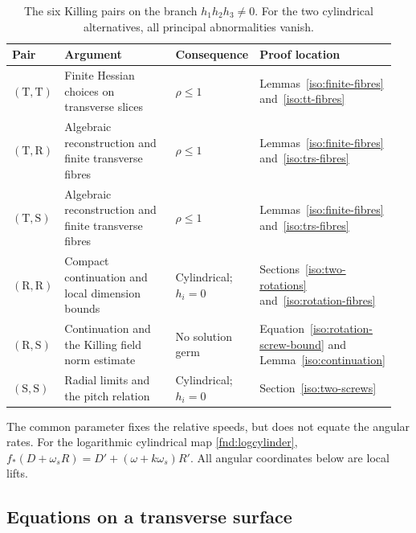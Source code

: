 \documentclass[11pt,a4paper]{article}
\numberwithin{equation}{section}
\theoremstyle{plain}
\theoremstyle{definition}
\theoremstyle{remark}
\begin{document}
\begin{table}[htbp]
\centering
\small
\renewcommand{\arraystretch}{1.12}
\setlength{\tabcolsep}{3pt}
\caption{The six Killing pairs on the branch $h_1h_2h_3\ne0$.
For the two cylindrical alternatives, all principal abnormalities vanish.}
\label{tab:killing-pairs}
\begin{tabular}{@{}>{\raggedright\arraybackslash}p{0.13\linewidth}>{\raggedright\arraybackslash}p{0.37\linewidth}>{\raggedright\arraybackslash}p{0.18\linewidth}>{\raggedright\arraybackslash}p{0.27\linewidth}@{}}
\toprule
Pair & Argument & Consequence & Proof location\\
\midrule
$(\mathrm T,\mathrm T)$ &
Finite Hessian choices on transverse slices &
$\rho\le1$ &
Lemmas~\ref{iso:finite-fibres} and~\ref{iso:tt-fibres}\\
\addlinespace
$(\mathrm T,\mathrm R)$ &
Algebraic reconstruction and finite transverse fibres &
$\rho\le1$ &
Lemmas~\ref{iso:finite-fibres} and~\ref{iso:trs-fibres}\\
\addlinespace
$(\mathrm T,\mathrm S)$ &
Algebraic reconstruction and finite transverse fibres &
$\rho\le1$ &
Lemmas~\ref{iso:finite-fibres} and~\ref{iso:trs-fibres}\\
\addlinespace
$(\mathrm R,\mathrm R)$ &
Compact continuation and local dimension bounds &
Cylindrical;\newline $h_i=0$ &
Sections~\ref{iso:two-rotations} and~\ref{iso:rotation-fibres}\\
\addlinespace
$(\mathrm R,\mathrm S)$ &
Continuation and the Killing field norm estimate &
No solution germ &
Equation~\eqref{iso:rotation-screw-bound} and Lemma~\ref{iso:continuation}\\
\addlinespace
$(\mathrm S,\mathrm S)$ &
Radial limits and the pitch relation &
Cylindrical;\newline $h_i=0$ &
Section~\ref{iso:two-screws}\\
\bottomrule
\end{tabular}
\end{table}

The common parameter fixes the relative speeds, but does not equate
the angular rates. For the logarithmic cylindrical map
\eqref{fnd:logcylinder},
$f_*(D+\omega_sR)=D'+(\omega+k\omega_s)R'$.
All angular coordinates below are local lifts.

\subsection{Equations on a transverse surface}
\end{document}

